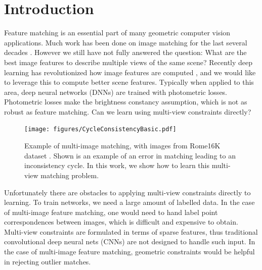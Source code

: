 \documentclass[10pt,twocolumn,letterpaper]{article}
\begin{document}
\section{Introduction}

Feature matching is an essential part of many geometric computer vision applications.
Much work has been done on image matching for the last several decades \cite{fischler1981random}.
However we still have not fully answered the question: What are the best image features to describe multiple views of the same scene?
Recently deep learning has revolutionized how image features are computed \cite{yi2016lift}, and we would like to leverage this to compute better scene features.
Typically when applied to this area, deep neural networks (DNNs) are trained with photometric losses.
Photometric losses make the brightness constancy assumption, which is not as robust as feature matching.
Can we learn using multi-view constraints directly?

\begin{figure}[t]
\begin{center}
  \texttt{[image: figures/CycleConsistencyBasic.pdf]}
\end{center}
  \caption{
    Example of multi-image matching, with images from Rome16K dataset \cite{li2010location}.
    Shown is an example of an error in matching leading to an inconsistency cycle.
    In this work, we show how to learn this multi-view matching problem.
  }
\label{fig:cycconsistex}
\label{fig:onecol}
\end{figure}


Unfortunately there are obstacles to applying multi-view constraints directly to learning. 
To train networks, we need a large amount of labelled data.
In the case of multi-image feature matching, one would need to hand label point correspondences between images, which is difficult and expensive to obtain.
Multi-view constraints are formulated in terms of sparse features, thus traditional convolutional deep neural nets (CNNs) are not designed to handle such input.
In the case of multi-image feature matching, geometric constraints would be helpful in rejecting outlier matches.
\end{document}
